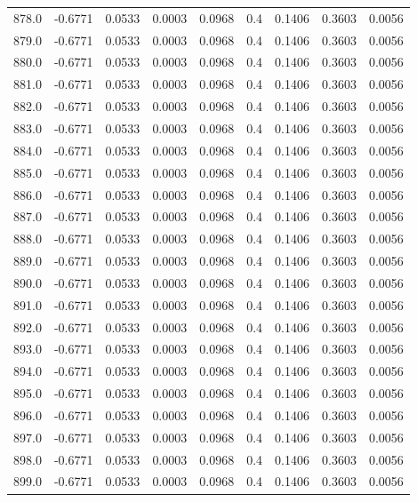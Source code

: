 \begin{longtable}{lrrrrrrrr}
878.0 & -0.6771 & 0.0533 & 0.0003 & 0.0968 & 0.4 & 0.1406 & 0.3603 & 0.0056 \\
879.0 & -0.6771 & 0.0533 & 0.0003 & 0.0968 & 0.4 & 0.1406 & 0.3603 & 0.0056 \\
880.0 & -0.6771 & 0.0533 & 0.0003 & 0.0968 & 0.4 & 0.1406 & 0.3603 & 0.0056 \\
881.0 & -0.6771 & 0.0533 & 0.0003 & 0.0968 & 0.4 & 0.1406 & 0.3603 & 0.0056 \\
882.0 & -0.6771 & 0.0533 & 0.0003 & 0.0968 & 0.4 & 0.1406 & 0.3603 & 0.0056 \\
883.0 & -0.6771 & 0.0533 & 0.0003 & 0.0968 & 0.4 & 0.1406 & 0.3603 & 0.0056 \\
884.0 & -0.6771 & 0.0533 & 0.0003 & 0.0968 & 0.4 & 0.1406 & 0.3603 & 0.0056 \\
885.0 & -0.6771 & 0.0533 & 0.0003 & 0.0968 & 0.4 & 0.1406 & 0.3603 & 0.0056 \\
886.0 & -0.6771 & 0.0533 & 0.0003 & 0.0968 & 0.4 & 0.1406 & 0.3603 & 0.0056 \\
887.0 & -0.6771 & 0.0533 & 0.0003 & 0.0968 & 0.4 & 0.1406 & 0.3603 & 0.0056 \\
888.0 & -0.6771 & 0.0533 & 0.0003 & 0.0968 & 0.4 & 0.1406 & 0.3603 & 0.0056 \\
889.0 & -0.6771 & 0.0533 & 0.0003 & 0.0968 & 0.4 & 0.1406 & 0.3603 & 0.0056 \\
890.0 & -0.6771 & 0.0533 & 0.0003 & 0.0968 & 0.4 & 0.1406 & 0.3603 & 0.0056 \\
891.0 & -0.6771 & 0.0533 & 0.0003 & 0.0968 & 0.4 & 0.1406 & 0.3603 & 0.0056 \\
892.0 & -0.6771 & 0.0533 & 0.0003 & 0.0968 & 0.4 & 0.1406 & 0.3603 & 0.0056 \\
893.0 & -0.6771 & 0.0533 & 0.0003 & 0.0968 & 0.4 & 0.1406 & 0.3603 & 0.0056 \\
894.0 & -0.6771 & 0.0533 & 0.0003 & 0.0968 & 0.4 & 0.1406 & 0.3603 & 0.0056 \\
895.0 & -0.6771 & 0.0533 & 0.0003 & 0.0968 & 0.4 & 0.1406 & 0.3603 & 0.0056 \\
896.0 & -0.6771 & 0.0533 & 0.0003 & 0.0968 & 0.4 & 0.1406 & 0.3603 & 0.0056 \\
897.0 & -0.6771 & 0.0533 & 0.0003 & 0.0968 & 0.4 & 0.1406 & 0.3603 & 0.0056 \\
898.0 & -0.6771 & 0.0533 & 0.0003 & 0.0968 & 0.4 & 0.1406 & 0.3603 & 0.0056 \\
899.0 & -0.6771 & 0.0533 & 0.0003 & 0.0968 & 0.4 & 0.1406 & 0.3603 & 0.0056 \\

\end{longtable}
